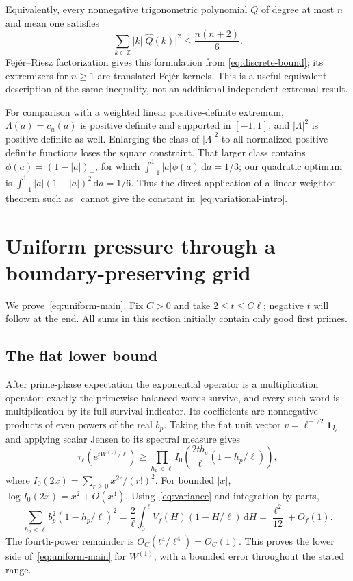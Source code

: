 \documentclass[11pt,reqno]{amsart}
\numberwithin{equation}{section}
\newcommand{\dd}{\,\mathrm d}
\newcommand{\one}{\mathbf 1}
\newcommand{\abs}[1]{\lvert#1\rvert}
\begin{document}
Equivalently, every nonnegative trigonometric polynomial $Q$ of
degree at most $n$ and mean one satisfies
\[
 \sum_{k\in\mathbb Z}\abs k\abs{\widehat Q(k)}^2
           \le\frac{n(n+2)}6.
\]
Fej\'er--Riesz factorization gives this formulation from
\eqref{eq:discrete-bound}; its extremizers for $n\ge1$ are translated
Fej\'er kernels. This is a useful equivalent description of the
same inequality, not an additional independent extremal result.

For comparison with a weighted linear positive-definite extremum,
$\Lambda(a)=c_u(a)$ is positive definite and supported in $[-1,1]$,
and $\abs\Lambda^2$ is positive definite as well. Enlarging the
class of $\abs\Lambda^2$ to all normalized positive-definite
functions loses the square constraint. That larger class contains
$\phi(a)=(1-\abs a)_+$, for which
$\int_{-1}^1\abs a\phi(a)\dd a=1/3$; our quadratic optimum is
$\int_{-1}^1\abs a(1-\abs a)^2\dd a=1/6$.
Thus the direct application of a linear weighted theorem such
as~\cite{Manov} cannot give the constant in~\eqref{eq:variational-intro}.

\section{Uniform pressure through a boundary-preserving grid}\label{sec:pressure}

We prove~\eqref{eq:uniform-main}. Fix $C>0$ and take
$2\le t\le C\ell$; negative $t$ will follow at the end.
All sums in this section initially contain only good first primes.

\subsection*{The flat lower bound}

After prime-phase expectation the exponential operator is a
multiplication operator: exactly the primewise balanced words
survive, and every such word is multiplication by its full
survival indicator. Its coefficients are nonnegative products of
even powers of the real $b_p$. Taking the flat unit vector
$v=\ell^{-1/2}\one_{I_\ell}$ and applying scalar Jensen to its
spectral measure gives
\begin{equation}\label{eq:bessel-lower}
 \tau_\ell(e^{tW^{(1)}/\ell})
 \ge\prod_{h_p<\ell}I_0\left(
          \frac{2t b_p}{\ell}(1-h_p/\ell)\right),
\end{equation}
where $I_0(2x)=\sum_{r\ge0}x^{2r}/(r!)^2$.
For bounded $\abs x$, $\log I_0(2x)=x^2+O(x^4)$.
Using~\eqref{eq:variance} and integration by parts,
\[
 \sum_{h_p<\ell}b_p^2(1-h_p/\ell)^2
   =\frac2\ell\int_0^\ell V_f(H)(1-H/\ell)\dd H
   =\frac{\ell^2}{12}+O_f(1).
\]
The fourth-power remainder is $O_C(t^4/\ell^4)=O_C(1)$.
This proves the lower side of~\eqref{eq:uniform-main} for
$W^{(1)}$, with a bounded error throughout the stated range.
\end{document}
